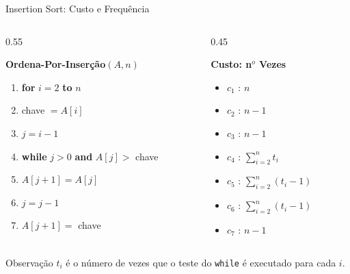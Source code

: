 \documentclass{beamer}
\begin{document}
\begin{frame}{Insertion Sort: Custo e Frequência}

\small

\begin{columns}[T]

\begin{column}{0.55\textwidth}

\textbf{Ordena-Por-Inserção$(A,n)$}

\begin{enumerate}
    \item \textbf{for} $i = 2$ \textbf{to} $n$
    \item \quad chave $= A[i]$
    \item \quad $j = i - 1$
    \item \quad \textbf{while} $j > 0$ \textbf{and} $A[j] >$ chave
    \item \qquad $A[j+1] = A[j]$
    \item \qquad $j = j - 1$
    \item \quad $A[j+1] =$ chave
\end{enumerate}

\end{column}

\begin{column}{0.45\textwidth}

\textbf{Custo: n$^o$ Vezes}

\vspace{0.2cm}

\begin{itemize}
    \item $c_1$ : $n$ 
    \item $c_2$ : $n - 1$ 
    \item $c_3$ : $n - 1$ 
    \item $c_4$ : $\sum_{i=2}^{n} t_i$ 
    \item $c_5$ : $\sum_{i=2}^{n} (t_i - 1)$ 
    \item $c_6$ : $\sum_{i=2}^{n} (t_i - 1)$ 
    \item $c_7$ : $n - 1$ 
\end{itemize}

\end{column}

\end{columns}

\vspace{0.3cm}

\begin{alertblock}{Observação}
$t_i$ é o número de vezes que o teste do \texttt{while} é executado para cada $i$.
\end{alertblock}

\end{frame}
\end{document}
